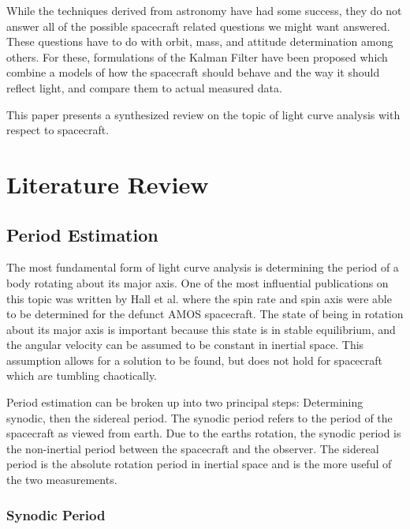 \documentclass{article}
\begin{document}
While the techniques derived from astronomy have had some success, they do not answer all of the possible spacecraft related questions we might want answered. These questions have to do with orbit, mass, and attitude determination among others. For these, formulations of the Kalman Filter have been proposed which combine a models of how the spacecraft should behave and the way it should reflect light, and compare them to actual measured data. 

This paper presents a synthesized review on the topic of light curve analysis with respect to spacecraft.

\section{Literature Review}

\subsection{Period Estimation}

The most fundamental form of light curve analysis is determining the period of a body rotating about its major axis. One of the most influential publications on this topic was written by Hall et al.\cite{AMOS} where the spin rate and spin axis were able to be determined for the defunct AMOS spacecraft. The state of being in rotation about its major axis is important because this state is in stable equilibrium, and the angular velocity can be assumed to be constant in inertial space. This assumption allows for a solution to be found, but does not hold for spacecraft which are tumbling chaotically.

Period estimation can be broken up into two principal steps: Determining synodic, then the sidereal period. The synodic period refers to the period of the spacecraft as viewed from earth. Due to the earths rotation, the synodic period is the non-inertial period between the spacecraft and the observer. The sidereal period is the absolute rotation period in inertial space and is the more useful of the two measurements. 

\subsubsection{Synodic Period}
\end{document}
